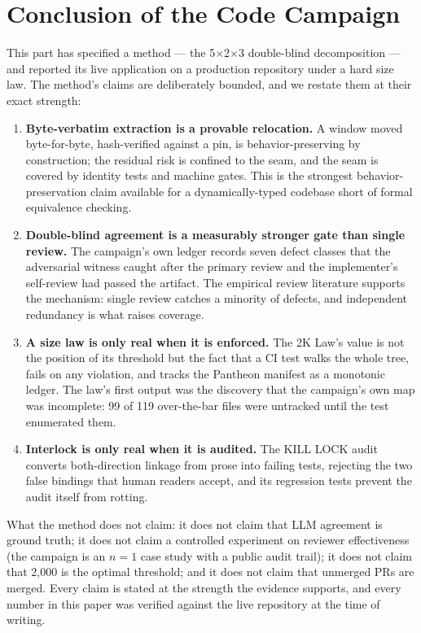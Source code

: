 \documentclass[11pt]{article}
\theoremstyle{definition}
\theoremstyle{plain}
\theoremstyle{remark}
\begin{document}
\section{Conclusion of the Code Campaign}

This part has specified a method --- the 5$\times$2$\times$3 double-blind
decomposition --- and reported its live application on a production
repository under a hard size law. The method's claims are deliberately
bounded, and we restate them at their exact strength:

\begin{enumerate}[leftmargin=*]
\item \textbf{Byte-verbatim extraction is a provable relocation.} A window
  moved byte-for-byte, hash-verified against a pin, is behavior-preserving
  by construction; the residual risk is confined to the seam, and the seam is
  covered by identity tests and machine gates. This is the strongest
  behavior-preservation claim available for a dynamically-typed codebase
  short of formal equivalence checking.
\item \textbf{Double-blind agreement is a measurably stronger gate than
  single review.} The campaign's own ledger records seven defect classes
  that the adversarial witness caught after the primary review and the
  implementer's self-review had passed the artifact. The empirical review
  literature supports the mechanism: single review catches a minority of
  defects, and independent redundancy is what raises coverage.
\item \textbf{A size law is only real when it is enforced.} The 2K Law's
  value is not the position of its threshold but the fact that a CI test
  walks the whole tree, fails on any violation, and tracks the Pantheon
  manifest as a monotonic ledger. The law's first output was the discovery
  that the campaign's own map was incomplete: 99 of 119 over-the-bar files
  were untracked until the test enumerated them.
\item \textbf{Interlock is only real when it is audited.} The KILL LOCK
  audit converts both-direction linkage from prose into failing tests,
  rejecting the two false bindings that human readers accept, and its
  regression tests prevent the audit itself from rotting.
\end{enumerate}

What the method does not claim: it does not claim that LLM agreement is
ground truth; it does not claim a controlled experiment on reviewer
effectiveness (the campaign is an $n=1$ case study with a public audit
trail); it does not claim that 2{,}000 is the optimal threshold; and it does
not claim that unmerged PRs are merged. Every claim is stated at the strength
the evidence supports, and every number in this paper was verified against
the live repository at the time of writing.
\end{document}
